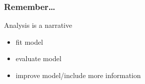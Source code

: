 \documentclass{beamer}
\begin{document}

\begin{frame}
  \frametitle{Remember\dots}
  Analysis is a narrative

  \bigskip

  \begin{itemize}
    \item fit model
    \item evaluate model
    \item improve model/include more information
  \end{itemize}
\end{frame}
\end{document}
